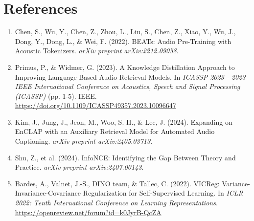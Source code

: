 \documentclass[11pt]{article}
\begin{document}
\section{References}

\begin{enumerate}[itemsep=4pt]
    \item Chen, S., Wu, Y., Chen, Z., Zhou, L., Liu, S., Chen, Z., Xiao, Y., Wu, J., Dong, Y., Dong,
    L., \& Wei, F. (2022). BEATs: Audio Pre-Training with Acoustic Tokenizers. \textit{arXiv
    preprint arXiv:2212.09058}.

    \item Primus, P., \& Widmer, G. (2023). A Knowledge Distillation Approach to Improving
    Language-Based Audio Retrieval Models. In \textit{ICASSP 2023 - 2023 IEEE International
    Conference on Acoustics, Speech and Signal Processing (ICASSP)} (pp. 1-5). IEEE.
    \url{https://doi.org/10.1109/ICASSP49357.2023.10096647}

    \item Kim, J., Jung, J., Jeon, M., Woo, S. H., \& Lee, J. (2024). Expanding on EnCLAP with an
    Auxiliary Retrieval Model for Automated Audio Captioning. \textit{arXiv preprint
    arXiv:2405.03713}.

    \item Shu, Z., et al. (2024). InfoNCE: Identifying the Gap Between Theory and Practice.
    \textit{arXiv preprint arXiv:2407.00143}.

    \item Bardes, A., Valnet, J.-S., DINO team, \& Tallec, C. (2022). VICReg:
    Variance-Invariance-Covariance Regularization for Self-Supervised Learning. In \textit{ICLR
    2022: Tenth International Conference on Learning Representations}.
    \url{https://openreview.net/forum?id=k0JyrB-QcZA}
\end{enumerate}
\end{document}
